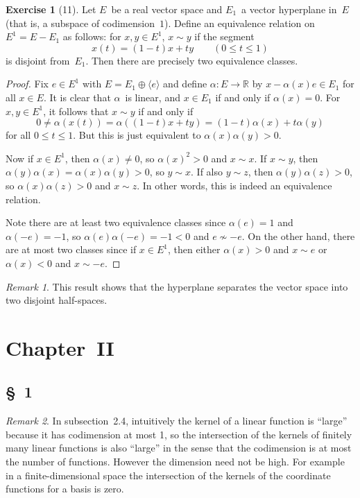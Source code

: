 \documentclass[letterpaper,12pt]{article}
\newcommand{\R}{\mathbb{R}}
\renewcommand{\equiv}{\sim}
\newcommand{\dsum}{\oplus}
\newcommand{\gen}[1]{\langle#1\rangle}
\theoremstyle{definition}
\newtheorem*{exer}{Exercise}
\theoremstyle{remark}
\newtheorem*{rmk}{Remark}
\begin{document}
\begin{exer}[11]
Let \(E\)~be a real vector space and \(E_1\)~a vector hyperplane in~\(E\) (that is, a subspace of codimension~\(1\)). Define an equivalence relation on \(E^1=E-E_1\) as follows: for \(x,y\in E^1\), \(x\equiv y\) if the segment
\[x(t)=(1-t)x+ty\qquad(0\le t\le 1)\]
is disjoint from~\(E_1\). Then there are precisely two equivalence classes.
\end{exer}
\begin{proof}
Fix \(e\in E^1\) with \(E=E_1\dsum\gen{e}\) and define \(\alpha:E\to\R\) by \(x-\alpha(x)e\in E_1\) for all \(x\in E\). It is clear that \(\alpha\)~is linear, and \(x\in E_1\) if and only if \(\alpha(x)=0\). For \(x,y\in E^1\), it follows that \(x\equiv y\) if and only if
\[0\ne\alpha(x(t))=\alpha((1-t)x+ty)=(1-t)\alpha(x)+t\alpha(y)\]
for all \(0\le t\le 1\). But this is just equivalent to \(\alpha(x)\alpha(y)>0\).

Now if \(x\in E^1\), then \(\alpha(x)\ne0\), so \(\alpha(x)^2>0\) and \(x\equiv x\). If \(x\equiv y\), then \(\alpha(y)\alpha(x)=\alpha(x)\alpha(y)>0\), so \(y\equiv x\). If also \(y\equiv z\), then \(\alpha(y)\alpha(z)>0\), so \(\alpha(x)\alpha(z)>0\) and \(x\equiv z\). In other words, this is indeed an equivalence relation.

Note there are at least two equivalence classes since \(\alpha(e)=1\) and \(\alpha(-e)=-1\), so \(\alpha(e)\alpha(-e)=-1<0\) and \(e\not\equiv -e\). On the other hand, there are at most two classes since if \(x\in E^1\), then either \(\alpha(x)>0\) and \(x\equiv e\) or \(\alpha(x)<0\) and \(x\equiv -e\).
\end{proof}
\begin{rmk}
This result shows that the hyperplane separates the vector space into two disjoint half-spaces.
\end{rmk}

\newpage
\section*{Chapter~II}
\subsection*{\S~1}
\begin{rmk}
In subsection~2.4, intuitively the kernel of a linear function is ``large'' because it has codimension at most 1, so the intersection of the kernels of finitely many linear functions is also ``large'' in the sense that the codimension is at most the number of functions. However the dimension need not be high. For example in a finite-dimensional space the intersection of the kernels of the coordinate functions for a basis is zero.
\end{rmk}
\end{document}
